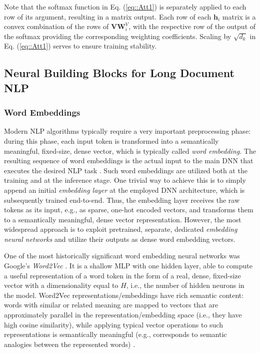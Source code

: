 \documentclass[preprint,review,10pt]{elsarticle}
\begin{document}
	Note that the softmax function in Eq. (\ref{eq::Att1}) is separately applied to each row of its argument, resulting in a matrix output. Each row of each $\textbf{h}_i$ matrix is a convex combination of the rows of $\textbf{V}\textbf{W}^{V}_i$, with the respective row of the output of the softmax providing the corresponding weighting coefficients. Scaling by $\sqrt{d_k}$ in Eq. (\ref{eq::Att1}) serves to ensure training stability.
	
	\subsection{Neural Building Blocks for Long Document NLP}
	\subsubsection{Word Embeddings}
	Modern NLP algorithms typically require a very important preprocessing phase: during this phase, each input token is transformed into a semantically meaningful, fixed-size, dense vector, which is typically called \textit{word embedding}. The resulting sequence of word embeddings is the actual input to the main DNN that executes the desired NLP task \cite{mikolov}. Such word embeddings are utilized both at the training and at the inference stage. One trivial way to achieve this is to simply append an initial \textit{embedding layer} at the employed DNN architecture, which is subsequently trained end-to-end. Thus, the embedding layer receives the raw tokens as its input, e.g., as sparse, one-hot encoded vectors, and transforms them to a semantically meaningful, dense vector representation. However, the most widespread approach is to exploit pretrained, separate, dedicated \textit{embedding neural networks} and utilize their outputs as dense word embedding vectors.
	
	One of the most historically significant word embedding neural networks was Google's \textit{Word2Vec} \cite{mikolov}. It is a shallow MLP with one hidden layer, able to compute a useful representation of a word token in the form of a real, dense, fixed-size vector with a dimensionality equal to $H$, i.e., the number of hidden neurons in the model. Word2Vec\cite{mikolov} representations/embeddings have rich semantic content: words with similar or related meaning are mapped to vectors that are approximately parallel in the representation/embedding space (i.e., they have high cosine similarity), while applying typical vector operations to such representations is semantically meaningful (e.g., corresponds to semantic analogies between the represented words) \cite{jurafsky}.
	
\end{document}
